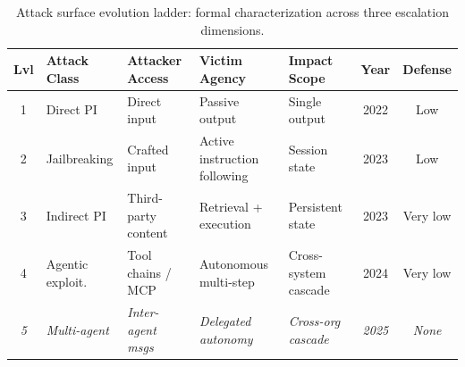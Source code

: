 
\begin{table}[htbp]
\centering
\caption{Attack surface evolution ladder: formal characterization across three escalation dimensions.}
\label{tab:ladder}
\scriptsize
\setlength{\tabcolsep}{4pt}
\renewcommand{\arraystretch}{0.92}
\begin{tabularx}{\textwidth}{c l l l l c c}
\toprule
\textbf{Lvl} & \textbf{Attack Class} & \textbf{Attacker Access} & \textbf{Victim Agency} & \textbf{Impact Scope} & \textbf{Year} & \textbf{Defense} \\
\midrule
1 & Direct PI & Direct input & Passive output & Single output & 2022 & Low \\
2 & Jailbreaking & Crafted input & Active instruction following & Session state & 2023 & Low \\
3 & Indirect PI & Third-party content & Retrieval + execution & Persistent state & 2023 & Very low \\
4 & Agentic exploit. & Tool chains / MCP & Autonomous multi-step & Cross-system cascade & 2024 & Very low \\
\emph{5} & \emph{Multi-agent} & \emph{Inter-agent msgs} & \emph{Delegated autonomy} & \emph{Cross-org cascade} & \emph{2025} & \emph{None} \\
\bottomrule
\end{tabularx}
\end{table}
